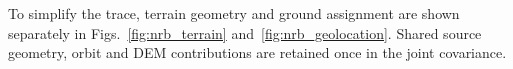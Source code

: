 To simplify the trace, terrain geometry and ground assignment are shown separately in Figs.~\ref{fig:nrb_terrain}
and~\ref{fig:nrb_geolocation}. Shared source geometry, orbit and DEM contributions are retained once in the joint covariance.










